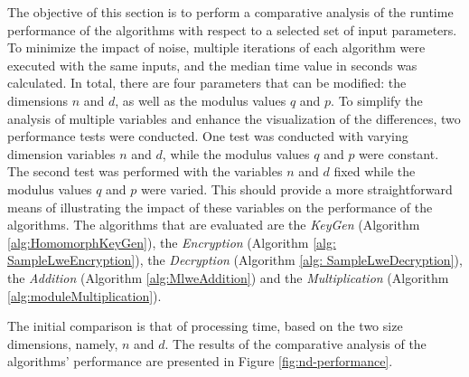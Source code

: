 The objective of this section is to perform a comparative analysis of the runtime performance of the algorithms with respect to a selected set of input parameters. To minimize the impact of noise, multiple iterations of each algorithm were executed with the same inputs, and the median time value in seconds was calculated. In total, there are four parameters that can be modified: the dimensions $n$ and $d$, as well as the modulus values $q$ and $p$. To simplify the analysis of multiple variables and enhance the visualization of the differences, two performance tests were conducted. One test was conducted with varying dimension variables $n$ and $d$, while the modulus values $q$ and $p$ were constant. The second test was performed with the variables $n$ and $d$ fixed while the modulus values $q$ and $p$ were varied. This should provide a more straightforward means of illustrating the impact of these variables on the performance of the algorithms. The algorithms that are evaluated are the \textit{KeyGen} (Algorithm \ref{alg:HomomorphKeyGen}), the \textit{Encryption} (Algorithm \ref{alg: SampleLweEncryption}), the \textit{Decryption} (Algorithm \ref{alg: SampleLweDecryption}), the \textit{Addition} (Algorithm \ref{alg:MlweAddition}) and the \textit{Multiplication} (Algorithm \ref{alg:moduleMultiplication}).

The initial comparison is that of processing time, based on the two size dimensions, namely, $n$ and $d$. The results of the comparative analysis of the algorithms' performance are presented in Figure \ref{fig:nd-performance}. 

